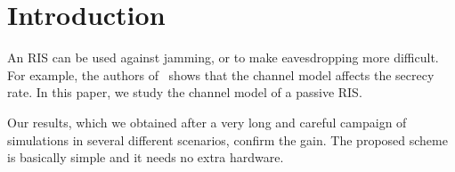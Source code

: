\documentclass{article}
\begin{document}
\section{Introduction}

An \ac{RIS} can be used against jamming, or to make eavesdropping more difficult. For example,
the authors of~\cite{a,b} shows that the channel model affects the secrecy rate.
In this paper, we study the channel model of a passive \ac{RIS}.

Our results, which we obtained after a very long and careful campaign of
    simulations in several different scenarios, confirm the gain.
The proposed scheme is basically simple and it needs no extra hardware.
\end{document}
